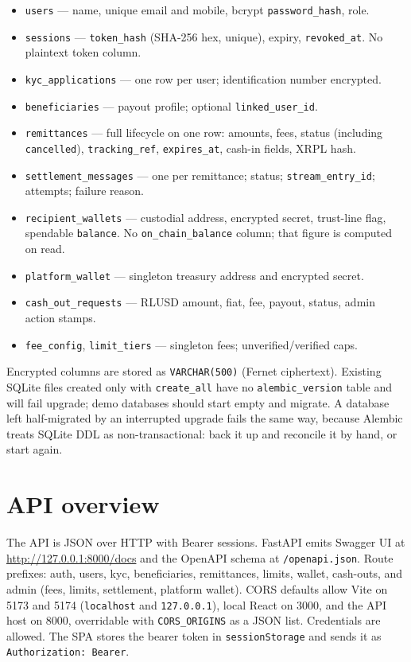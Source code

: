 \documentclass[11pt]{article}
\begin{document}
\begin{itemize}
  \item \texttt{users} --- name, unique email and mobile, bcrypt \texttt{password\_hash}, role.
  \item \texttt{sessions} --- \texttt{token\_hash} (SHA-256 hex, unique), expiry, \texttt{revoked\_at}. No plaintext token column.
  \item \texttt{kyc\_applications} --- one row per user; identification number encrypted.
  \item \texttt{beneficiaries} --- payout profile; optional \texttt{linked\_user\_id}.
  \item \texttt{remittances} --- full lifecycle on one row: amounts, fees, status (including \texttt{cancelled}), \texttt{tracking\_ref}, \texttt{expires\_at}, cash-in fields, XRPL hash.
  \item \texttt{settlement\_messages} --- one per remittance; status; \texttt{stream\_entry\_id}; attempts; failure reason.
  \item \texttt{recipient\_wallets} --- custodial address, encrypted secret, trust-line flag, spendable \texttt{balance}. No \texttt{on\_chain\_balance} column; that figure is computed on read.
  \item \texttt{platform\_wallet} --- singleton treasury address and encrypted secret.
  \item \texttt{cash\_out\_requests} --- RLUSD amount, fiat, fee, payout, status, admin action stamps.
  \item \texttt{fee\_config}, \texttt{limit\_tiers} --- singleton fees; unverified/verified caps.
\end{itemize}

Encrypted columns are stored as \texttt{VARCHAR(500)} (Fernet ciphertext). Existing SQLite files created only with \texttt{create\_all} have no \texttt{alembic\_version} table and will fail upgrade; demo databases should start empty and migrate. A database left half-migrated by an interrupted upgrade fails the same way, because Alembic treats SQLite DDL as non-transactional: back it up and reconcile it by hand, or start again.

\section{API overview}
The API is JSON over HTTP with Bearer sessions. FastAPI emits Swagger UI at \url{http://127.0.0.1:8000/docs} and the OpenAPI schema at \texttt{/openapi.json}. Route prefixes: auth, users, kyc, beneficiaries, remittances, limits, wallet, cash-outs, and admin (fees, limits, settlement, platform wallet). CORS defaults allow Vite on 5173 and 5174 (\texttt{localhost} and \texttt{127.0.0.1}), local React on 3000, and the API host on 8000, overridable with \texttt{CORS\_ORIGINS} as a JSON list. Credentials are allowed. The SPA stores the bearer token in \texttt{sessionStorage} and sends it as \texttt{Authorization: Bearer}.
\end{document}
